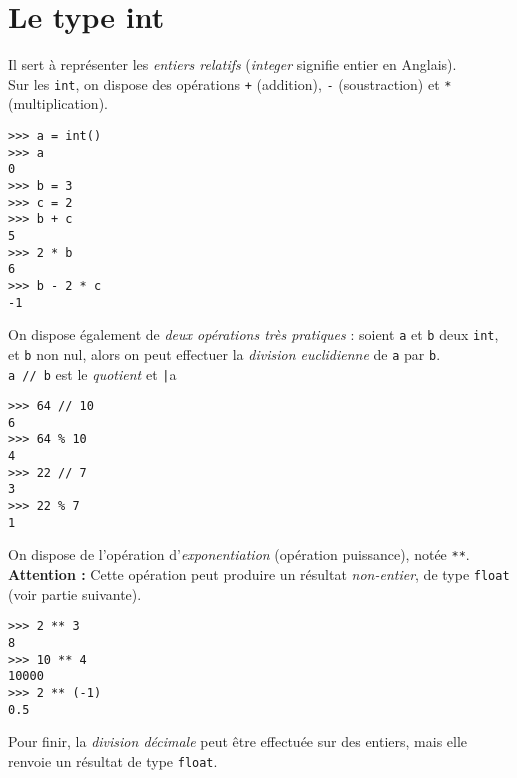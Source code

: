 \section{Le type int}\label{sec:int}

Il sert à représenter les \textit{entiers relatifs} (\textit{integer} signifie \og entier \fg{} en Anglais).\\
Sur les \texttt{int}, on dispose des opérations \texttt{+} (addition), \texttt{-} (soustraction) et \texttt{*} (multiplication).

\begin{pys}\begin{verbatim}
>>> a = int()
>>> a
0
>>> b = 3
>>> c = 2
>>> b + c
5
>>> 2 * b
6
>>> b - 2 * c
-1
\end{verbatim}
\end{pys}

On dispose également de \textit{deux opérations très pratiques} : soient \texttt{a} et \texttt{b} deux \texttt{int}, et \texttt{b} non nul, alors on peut effectuer
la \textit{division euclidienne} de \texttt{a} par \texttt{b}.\\
\texttt{a // b} est le \textit{quotient} et \texttt|a %

\begin{pys}\begin{verbatim}
>>> 64 // 10
6
>>> 64 % 10
4
>>> 22 // 7
3
>>> 22 % 7
1
\end{verbatim}
\end{pys}



On dispose de l'opération d'\textit{exponentiation} (opération puissance), notée \texttt{**}.\\
\textbf{Attention :} Cette opération peut produire un résultat \textit{non-entier}, de type \texttt{float} (voir partie suivante).

\begin{pys}\begin{verbatim}
>>> 2 ** 3
8
>>> 10 ** 4
10000
>>> 2 ** (-1)
0.5
\end{verbatim}
\end{pys}

Pour finir, la \textit{division décimale} peut être effectuée sur des entiers, mais elle renvoie un résultat de type \texttt{float}.


